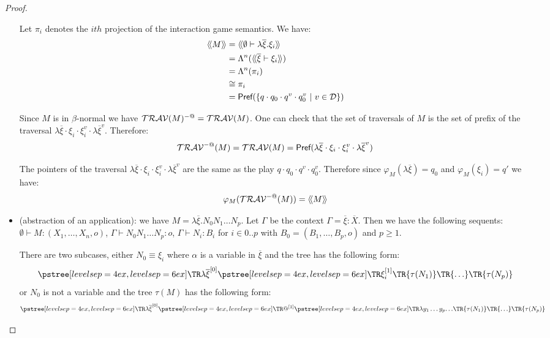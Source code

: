\begin{proof}
\begin{itemize}
        Let $\pi_i$ denotes the $ith$ projection of the interaction game
        semantics. We have:
        \begin{align*}
        {\langle\!\langle M \rangle\!\rangle} &= {\langle\!\langle \emptyset \vdash \lambda \overline{\xi} . \xi_i \rangle\!\rangle} \\
                     &= \Lambda^n({\langle\!\langle \overline{\xi} \vdash  \xi_i \rangle\!\rangle}) \\
                     &= \Lambda^n(\pi_i) \\
                     &\cong \pi_i \\
                     &= \textsf{Pref}(\{ q \cdot q_0 \cdot q^v \cdot q_0^v \ | \ v\in \mathcal{D} \})
        \end{align*}

        Since $M$ is in $\beta$-normal we have $\mathcal{TRAV}(M)^{-@} = \mathcal{TRAV}(M)$.
        One can check that the set of traversals of $M$ is the set of prefix of
        the traversal $\lambda \overline{\xi} \cdot \xi_i \cdot \xi_i^v \cdot \lambda
        \overline{\xi}^v$. Therefore:
        $$ \mathcal{TRAV}^{-@}(M) = \mathcal{TRAV}(M) = \textsf{Pref}( \lambda \overline{\xi} \cdot \xi_i \cdot \xi_i^v \cdot \lambda \overline{\xi}^v)
        $$

        The pointers of the traversal $\lambda \overline{\xi} \cdot \xi_i \cdot \xi_i^v \cdot \lambda
        \overline{\xi}^v$ are the same as the play $q \cdot q_0 \cdot q^v \cdot
        q_0^v$. Therefore since $\varphi_M(\lambda \overline{\xi}) = q_0$ and $\varphi_M(\xi_i) =
        q'$ we have:
        $$ \varphi_M(\mathcal{TRAV}^{-@}(M)) = {\langle\!\langle M \rangle\!\rangle}$$


    \item (abstraction of an application): we have $M = \lambda \overline{\xi} . N_0 N_1 \ldots N_p$. Let $\Gamma$ be the context
    $\Gamma = \overline{\xi} : \overline{X}$. Then we have the following sequents:
    $\emptyset \vdash M : (X_1,\ldots,X_n,o)$,
    $\Gamma \vdash N_0 N_1 \ldots N_p : o$,
    $\Gamma \vdash N_i : B_i$ for $i\in 0..p$ with $B_0 = (B_1,\ldots,B_p,o)$ and $p\geq 1$.

    There are two subcases, either $N_0 \equiv \xi_i$ where $\alpha$ is a variable in $\overline{\xi}$ and the tree has the following form:
    $$ \tree[levelsep=6ex]{\lambda \overline{\xi}^{[0]}}
        { \tree[levelsep=6ex]{\xi_i^{[1]}}
            {   \TR{\tau(N_1)} \TR{\ldots} \TR{\tau(N_p)}}}
    $$
    or $N_0$ is not a variable and the tree $\tau(M)$ has the following form:
    $$ \tree[levelsep=6ex]{\lambda \overline{\xi}^{[0]}}
        { \tree[levelsep=6ex]{@^{[1]}}
            {
            \tree[levelsep=6ex]{\lambda y_1 \ldots y_p}{\ldots}
            \TR{\tau(N_1)} \TR{\ldots} \TR{\tau(N_p)}}}
    $$


\end{itemize}
\end{proof}
